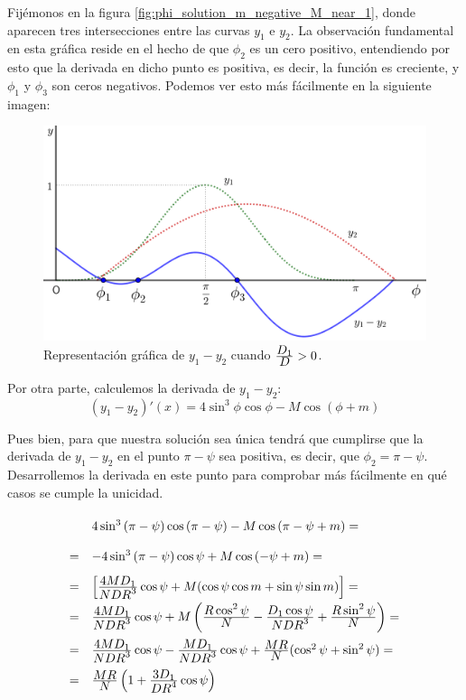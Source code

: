 Fijémonos en la figura \ref{fig:phi_solution_m_negative_M_near_1}, donde aparecen tres intersecciones entre las curvas $y_1$ e $y_2$. La observación fundamental en esta gráfica reside en el hecho de que $\phi_2$ es un cero positivo, entendiendo por esto que la derivada en dicho punto es positiva, es decir, la función es creciente, y $\phi_1$ y $\phi_3$ son ceros negativos. Podemos ver esto más fácilmente en la siguiente imagen:

\begin{figure}[H]
\centering
\includegraphics[scale=0.125]{images/y_1_menos_y_2.png}
\caption{Representación gráfica de $y_1-y_2$ cuando $\frac{\displaystyle D_1}{\displaystyle D}>0$.}
\label{fig:y_1_menos_y_2}
\end{figure}

Por otra parte, calculemos la derivada de $y_1-y_2$:
\[
(y_1-y_2)'(x)=4\sin^3{\phi}\cos{\phi}-M\cos{(\phi+m)}
\]

Pues bien, para que nuestra solución sea única tendrá que cumplirse que la derivada de $y_1-y_2$ en el punto $\pi-\psi$ sea positiva, es decir, que $\phi_2=\pi-\psi$. Desarrollemos la derivada en este punto para comprobar más fácilmente en qué casos se cumple la unicidad.
\[
\def\arraystretch{2}
\begin{array}{ll}
  & 4\sin^3{(\pi-\psi)}\cos{(\pi-\psi)}-M\cos{(\pi-\psi+m)}=\\
= &-4\sin^3{(\pi-\psi)}\cos{\psi}+M\cos{(-\psi+m)}=\\
= & \left[\ddfrac{4MD_1}{NDR^3}\cos{\psi}+M(\cos{\psi}\cos{m}+\sin{\psi}\sin{m})\right]=\\
= & \ddfrac{4MD_1}{NDR^3}\cos{\psi}+M\left(\ddfrac{R\cos^2{\psi}}{N}-\ddfrac{D_1\cos{\psi}}{NDR^3}+\ddfrac{R\sin^2{\psi}}{N}\right)=\\
= & \ddfrac{4MD_1}{NDR^3}\cos{\psi}-\ddfrac{MD_1}{NDR^3}\cos{\psi}+\ddfrac{MR}{N}(\cos^2{\psi}+\sin^2{\psi})=\\
= & \ddfrac{MR}{N}\left(1+\ddfrac{3D_1}{DR^4}\cos{\psi}\right)
\end{array}
\]

